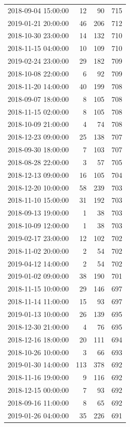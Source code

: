 \begin{tabular}{lrrr}
2018-09-04 15:00:00 & 12 & 90 & 715 \\
2019-01-21 20:00:00 & 46 & 206 & 712 \\
2018-10-30 23:00:00 & 14 & 132 & 710 \\
2018-11-15 04:00:00 & 10 & 109 & 710 \\
2019-02-24 23:00:00 & 29 & 182 & 709 \\
2018-10-08 22:00:00 & 6 & 92 & 709 \\
2018-11-20 14:00:00 & 40 & 199 & 708 \\
2018-09-07 18:00:00 & 8 & 105 & 708 \\
2018-11-15 02:00:00 & 8 & 105 & 708 \\
2018-10-09 21:00:00 & 4 & 74 & 708 \\
2018-12-23 09:00:00 & 25 & 138 & 707 \\
2018-09-30 18:00:00 & 7 & 103 & 707 \\
2018-08-28 22:00:00 & 3 & 57 & 705 \\
2018-12-13 09:00:00 & 16 & 105 & 704 \\
2018-12-20 10:00:00 & 58 & 239 & 703 \\
2018-11-10 15:00:00 & 31 & 192 & 703 \\
2018-09-13 19:00:00 & 1 & 38 & 703 \\
2018-10-09 12:00:00 & 1 & 38 & 703 \\
2019-02-17 23:00:00 & 12 & 102 & 702 \\
2018-11-02 20:00:00 & 2 & 54 & 702 \\
2019-04-12 14:00:00 & 2 & 54 & 702 \\
2019-01-02 09:00:00 & 38 & 190 & 701 \\
2018-11-15 10:00:00 & 29 & 146 & 697 \\
2018-11-14 11:00:00 & 15 & 93 & 697 \\
2019-01-13 10:00:00 & 26 & 139 & 695 \\
2018-12-30 21:00:00 & 4 & 76 & 695 \\
2018-12-16 18:00:00 & 20 & 111 & 694 \\
2018-10-26 10:00:00 & 3 & 66 & 693 \\
2019-01-30 14:00:00 & 113 & 378 & 692 \\
2018-11-16 19:00:00 & 9 & 116 & 692 \\
2018-12-15 00:00:00 & 7 & 93 & 692 \\
2018-09-16 11:00:00 & 8 & 65 & 692 \\
2019-01-26 04:00:00 & 35 & 226 & 691 \\

\end{tabular}
